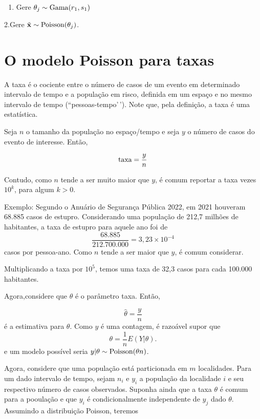 \documentclass[
  letterpaper,
  DIV=11,
  numbers=noendperiod]{scrreprt}
\providecommand{\tightlist}{%
  \setlength{\itemsep}{0pt}\setlength{\parskip}{0pt}}\usepackage{longtable,booktabs,array}
\theoremstyle{plain}
\theoremstyle{definition}
\theoremstyle{definition}
\theoremstyle{remark}
\begin{document}
\begin{enumerate}
\def\labelenumi{\arabic{enumi}.}
\tightlist
\item
  Gere \(\theta_j\sim\hbox{Gama}(r_1,s_1)\)
\end{enumerate}

2.Gere \(\tilde{\mathbf{x}}\sim\hbox{Poisson}(\theta_j)\).

\section{O modelo Poisson para taxas}\label{o-modelo-poisson-para-taxas}

A taxa é o cociente entre o número de casos de um evento em determinado
intervalo de tempo e a população em risco, definida em um espaço e no
mesmo intervalo de tempo (``pessoas-tempo'\,'). Note que, pela
definição, a taxa é uma estatística.

Seja \(n\) o tamanho da população no espaço/tempo e seja \(y\) o número
de casos do evento de interesse. Então,

\[\hbox{taxa} = \frac{y}{n}\]

Contudo, como \(n\) tende a ser muito maior que \(y\), é comum reportar
a taxa vezes \(10^k\), para algum \(k>0\).

Exemplo: Segundo o Anuário de Segurança Pública 2022, em 2021 houveram
68.885 casos de estupro. Considerando uma população de 212,7 milhões de
habitantes, a taxa de estupro para aquele ano foi de
\[\frac{68.885}{212.700.000}=3,23\times 10^{-4}\] casos por pessoa-ano.
Como \(n\) tende a ser maior que \(y\), é comum considerar.

Multiplicando a taxa por \(10^5\), temos uma taxa de 32,3 casos para
cada 100.000 habitantes.

Agora,considere que \(\theta\) é o parâmetro taxa. Então,

\[\hat{\theta}=\frac{y}{n}\] é a estimativa para \(\theta\). Como \(y\)
é uma contagem, é razoável supor que \[\theta =\frac{1}{n}E(Y|\theta).\]
e um modelo possível seria \(y|\theta\sim\hbox{Poisson}(\theta n)\).

Agora, considere que uma população está particionada em \(m\)
localidades. Para um dado intervalo de tempo, sejam \(n_i\) e \(y_i\) a
população da localidade \(i\) e seu respectivo número de casos
observados. Suponha ainda que a taxa \(\theta\) é comum para a pooulação
e que \(y_i\) é condicionalmente independente de \(y_j\) dado
\(\theta\). Assumindo a distribuição Poisson, teremos
\end{document}

